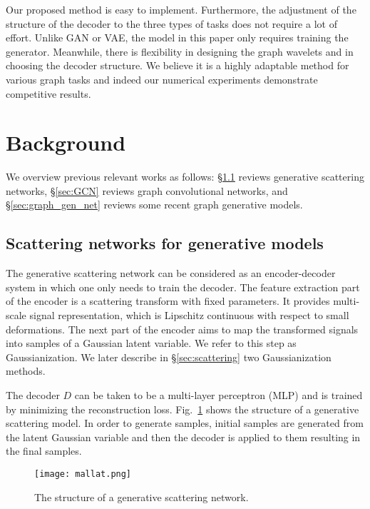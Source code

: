 \documentclass[conference]{IEEEtran}
\begin{document}
Our proposed method is easy to implement. Furthermore, the adjustment of the structure of the decoder to the three types of tasks does not require a lot of effort. 
Unlike GAN or VAE, the model in this paper only requires  training the generator. Meanwhile, there is flexibility in designing the graph wavelets and in choosing the decoder structure. We believe it is a highly adaptable method for various graph tasks and indeed our numerical experiments demonstrate competitive results.

\section{Background}\label{sec:background}

We overview previous relevant works as follows: \S\ref{sec:mallat} reviews generative scattering networks, 
\S\ref{sec:GCN} reviews graph convolutional networks, and \S\ref{sec:graph_gen_net} reviews some recent graph generative models.


\subsection{Scattering networks for generative models} \label{sec:mallat}

The generative scattering network \cite{angles2018generative} can be considered as an encoder-decoder system in  which one only needs to train the decoder. The feature extraction part of the encoder is a scattering transform \cite{mallat2012group, bruna2013invariant} with fixed parameters. It provides multi-scale signal representation, which is Lipschitz continuous with respect to small deformations. The next part of the encoder aims to map the transformed signals into samples of a Gaussian latent variable. We refer to this step as Gaussianization. We later describe in \S\ref{sec:scattering} two Gaussianization methods. 

The decoder $D$ can be taken to be a multi-layer perceptron (MLP) and is trained by minimizing the reconstruction loss.
Fig.~\ref{fig:mallat} shows the structure of a generative scattering model. In order to generate samples, initial samples are generated from the latent Gaussian variable and then the decoder is applied to them resulting in the final samples. 
\begin{figure}[t]
    \centering
    \texttt{[image: mallat.png]}
    \caption{The structure of a generative scattering network.}
    \label{fig:mallat}
\end{figure}
\end{document}
